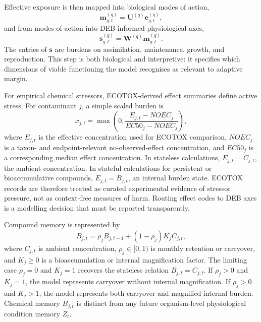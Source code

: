 Effective exposure is then mapped into biological modes of action,
\begin{equation}
  \mathbf{m}^{(q)}_{g,t} = \mathbf{U}^{(q)}\mathbf{e}^{(q)}_{g,t},
  \label{eq:moa_mapping}
\end{equation}
and from modes of action into DEB-informed physiological axes,
\begin{equation}
  \mathbf{s}^{(q)}_{g,t} = \mathbf{W}^{(q)}\mathbf{m}^{(q)}_{g,t}.
  \label{eq:deb_axis_mapping}
\end{equation}
The entries of $\mathbf{s}$ are burdens on assimilation, maintenance, growth, and reproduction. This step is both biological and interpretive: it specifies which dimensions of viable functioning the model recognises as relevant to adaptive margin.

For empirical chemical stressors, ECOTOX-derived effect summaries define active stress. For contaminant $j$, a simple scaled burden is
\begin{equation}
  x_{j,t} = \max\left(0,\frac{E_{j,t}-NOEC_j}{EC50_j-NOEC_j}\right),
  \label{eq:ecotox_scaling}
\end{equation}
where $E_{j,t}$ is the effective concentration used for ECOTOX comparison, $NOEC_j$ is a taxon- and endpoint-relevant no-observed-effect concentration, and $EC50_j$ is a corresponding median effect concentration. In stateless calculations, $E_{j,t}=C_{j,t}$, the ambient concentration. In stateful calculations for persistent or bioaccumulative compounds, $E_{j,t}=B_{j,t}$, an internal burden state. ECOTOX records are therefore treated as curated experimental evidence of stressor pressure, not as context-free measures of harm. Routing effect codes to DEB axes is a modelling decision that must be reported transparently.

Compound memory is represented by
\begin{equation}
  B_{j,t}=\rho_j B_{j,t-1}+(1-\rho_j)K_j C_{j,t},
  \label{eq:compound_memory}
\end{equation}
where $C_{j,t}$ is ambient concentration, $\rho_j\in[0,1)$ is monthly retention or carryover, and $K_j\geq 0$ is a bioaccumulation or internal magnification factor. The limiting case $\rho_j=0$ and $K_j=1$ recovers the stateless relation $B_{j,t}=C_{j,t}$. If $\rho_j>0$ and $K_j=1$, the model represents carryover without internal magnification. If $\rho_j>0$ and $K_j>1$, the model represents both carryover and magnified internal burden. Chemical memory $B_{j,t}$ is distinct from any future organism-level physiological condition memory $Z_t$.

